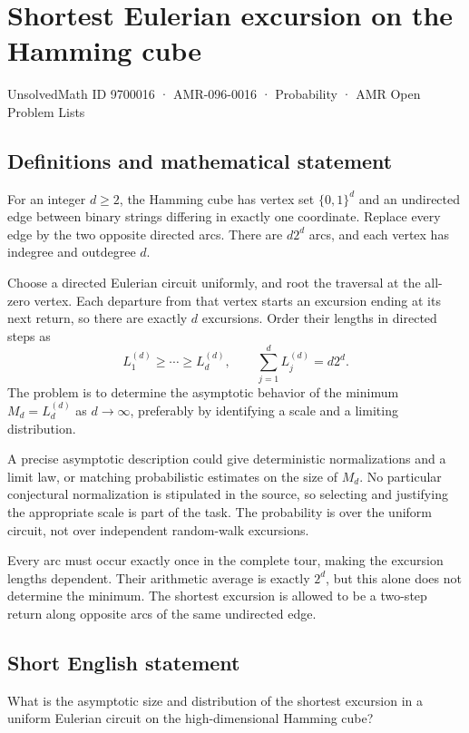 \documentclass[11pt,a4paper]{article}
\begin{document}
\section*{Shortest Eulerian excursion on the Hamming cube}\label{9700016}
{\small UnsolvedMath ID 9700016 · AMR-096-0016 · Probability · AMR Open Problem Lists}
\subsection{Definitions and mathematical statement}
For an integer $d\ge2$, the Hamming cube has vertex set $\{0,1\}^d$ and an undirected edge between binary strings differing in exactly one coordinate. Replace every edge by the two opposite directed arcs. There are $d2^d$ arcs, and each vertex has indegree and outdegree $d$.

Choose a directed Eulerian circuit uniformly, and root the traversal at the all-zero vertex. Each departure from that vertex starts an excursion ending at its next return, so there are exactly $d$ excursions. Order their lengths in directed steps as
\[
L_1^{(d)}\ge\cdots\ge L_d^{(d)},\qquad
\sum_{j=1}^dL_j^{(d)}=d2^d.
\]
The problem is to determine the asymptotic behavior of the minimum $M_d=L_d^{(d)}$ as $d\to\infty$, preferably by identifying a scale and a limiting distribution.

A precise asymptotic description could give deterministic normalizations and a limit law, or matching probabilistic estimates on the size of $M_d$. No particular conjectural normalization is stipulated in the source, so selecting and justifying the appropriate scale is part of the task. The probability is over the uniform circuit, not over independent random-walk excursions.

Every arc must occur exactly once in the complete tour, making the excursion lengths dependent. Their arithmetic average is exactly $2^d$, but this alone does not determine the minimum. The shortest excursion is allowed to be a two-step return along opposite arcs of the same undirected edge.
\subsection{Short English statement}
What is the asymptotic size and distribution of the shortest excursion in a uniform Eulerian circuit on the high-dimensional Hamming cube?
\end{document}
